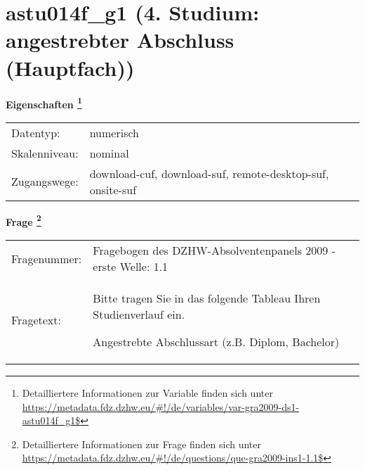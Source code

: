 
    \setcounter{footnote}{0}

    \vspace*{-1.8cm}
	\section{astu014f\_g1 (4. Studium: angestrebter Abschluss (Hauptfach))}
	\label{section:astu014f_g1}



    \vspace*{0.5cm}
    \noindent\textbf{Eigenschaften
	\footnote{Detailliertere Informationen zur Variable finden sich unter
		\url{https://metadata.fdz.dzhw.eu/\#!/de/variables/var-gra2009-ds1-astu014f_g1$}}}\\
	\begin{tabularx}{\hsize}{@{}lX}
	Datentyp: & numerisch \\
	Skalenniveau: & nominal \\
	Zugangswege: &
	  download-cuf, 
	  download-suf, 
	  remote-desktop-suf, 
	  onsite-suf
 \\
    \end{tabularx}



				\vspace*{0.5cm}
                \noindent\textbf{Frage
	                \footnote{Detailliertere Informationen zur Frage finden sich unter
		              \url{https://metadata.fdz.dzhw.eu/\#!/de/questions/que-gra2009-ins1-1.1$}}}\\
				\begin{tabularx}{\hsize}{@{}lX}
					Fragenummer: &
					  Fragebogen des DZHW-Absolventenpanels 2009 - erste Welle:
					  1.1
 \\
					Fragetext: & Bitte tragen Sie in das folgende Tableau Ihren Studienverlauf ein.\par  Angestrebte Abschlussart (z.B. Diplom, Bachelor) \\
				\end{tabularx}





